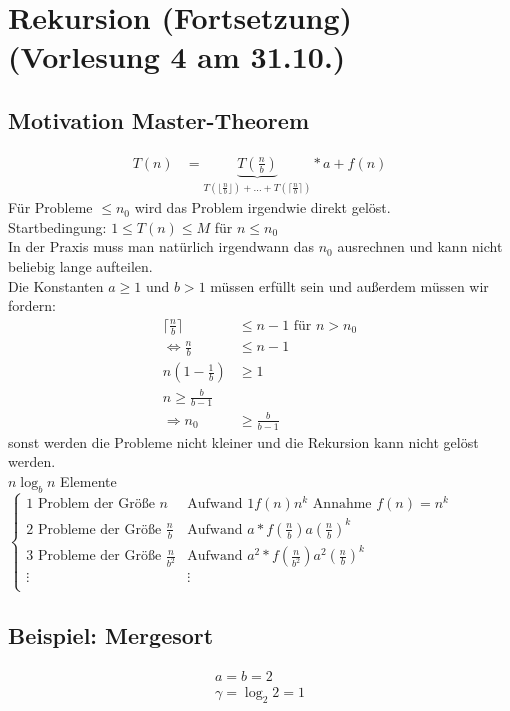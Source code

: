 \section{Rekursion (Fortsetzung) \tiny (Vorlesung 4 am 31.10.)}
\subsection{ Motivation Master-Theorem}
\begin{align*}
T(n) &= \underbrace{ T(\frac{n}{b}) }_{T( \lfloor \frac{n}{b} \rfloor) + \dots + T(\lceil \frac{n}{b}\rceil)}* a + f(n)
\end{align*}
Für Probleme $\leq n_0$ wird das Problem irgendwie direkt gelöst.\\
Startbedingung: $1 \leq T(n) \leq M$ für $n\leq n_0$\\

In der Praxis muss man natürlich irgendwann das $n_0$ ausrechnen und kann nicht beliebig lange aufteilen.\\
Die Konstanten $a \geq 1$ und $b > 1$ müssen erfüllt sein und außerdem müssen wir fordern:
\begin{align*}
\lceil \frac{n}{b} \rceil &\leq n-1 \text{ für } n > n_0\\
\Leftrightarrow \frac{n}{b} &\leq n-1\\
n(1-\frac{1}{b}) &\geq 1\\
n \geq \frac{b}{b-1}\\
\Rightarrow n_0 &\geq \frac{b}{b-1}
\end{align*}
sonst werden die Probleme nicht kleiner und die Rekursion kann nicht gelöst werden.\\
$n \log_b n$ Elemente
$\begin{cases}
1 \text{ Problem der Größe } n & \text{Aufwand }  1f(n)  n^k \text{ Annahme }f(n)=n^k\\
2 \text{ Probleme der Größe } \frac{n}{b} &\text{Aufwand }  a*f(\frac{n}{b})  a(\frac{n}{b})^k\\
3 \text{ Probleme der Größe } \frac{n}{b^2} &\text{Aufwand }  a^2*f(\frac{n}{b^2})  a^2(\frac{n}{b})^k\\
\vdots & \vdots \\

\end{cases}$
\subsection*{Beispiel: Mergesort}
\begin{align*}
a = b = 2\\
\gamma = \log_2 2  =1\\
\end{align*}


